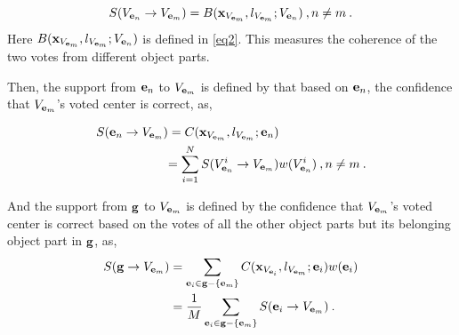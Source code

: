 \[
S({V_{{{\bf{e}}_n}}} \to {V_{{{\bf{e}}_m}}})  =  B({\bf{x}}_{V_{{{\bf{e}}_m}}},l_{V_{{{\bf{e}}_m}}};{V_{{{\bf{e}}_n}}})\:,n \ne m\:.
\]
Here $B({\bf{x}}_{V_{{{\bf{e}}_m}}},l_{V_{{{\bf{e}}_m}}};{V_{{{\bf{e}}_n}}})$ is defined in \ref{eq2}. This measures the coherence of the two votes from different object parts.

Then, the support from ${{\bf{e}}_n}$ to ${V_{{{\bf{e}}_m}}}$ is defined by that based on ${{\bf{e}}_n}$, the confidence that $V_{{{\bf{e}}_m}}$'s voted center is correct, as,

\[
\begin{aligned}
S({{{\bf{e}}_n} \to {V_{{{\bf{e}}_m}}}}) &= C({\bf{x}}_{V_{{{\bf{e}}_m}}},l_{V_{{{\bf{e}}_m}}};{{{\bf{e}}_n}})\\
& {
=\sum\limits^N_{i=1} {S({{V^i_{{{\bf{e}}_n}}} \to {V_{{{\bf{e}}_m}}}})w(V^i_{{\bf{e}}_n})}\:,n \ne m\:.
}
\end{aligned}
\]

And the support from ${\bf{g}}$ to $V_{{\bf{e}}_m}$ is defined by the confidence that $V_{{\bf{e}}_m}$'s voted center is correct based on the votes of all the other object parts but its belonging object part in $\bf{g}$, as,
\[
\begin{aligned}
S({\bf{g}} \to V_{{\bf{e}}_m})
&= \sum\limits_{{{\bf{e}}_i} \in {\bf{g}}- \{ {{\bf{e}}_m} \} }{C({\bf{x}}_{V_{{{\bf{e}}_i}}},l_{V_{{{\bf{e}}_m}}};{{{\bf{e}}_i}})w({{\bf{e}}_i})}\\
& =\frac 1 M  \sum\limits_{{{\bf{e}}_i} \in {\bf{g}}- \{ {{\bf{e}}_m} \}} {S({{{\bf{e}}_i} \to {V_{{{\bf{e}}_m}}}})} \:.
\end{aligned}
\]

